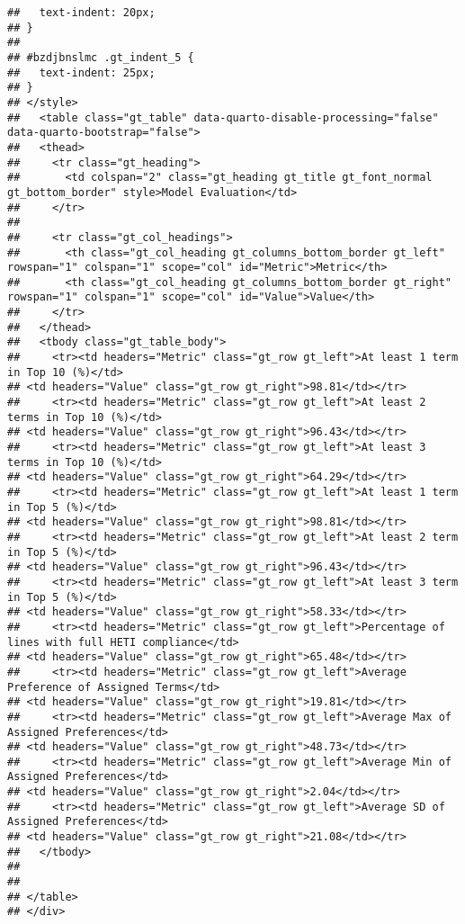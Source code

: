 \documentclass[
]{article}
\begin{document}
\begin{verbatim}
##   text-indent: 20px;
## }
## 
## #bzdjbnslmc .gt_indent_5 {
##   text-indent: 25px;
## }
## </style>
##   <table class="gt_table" data-quarto-disable-processing="false" data-quarto-bootstrap="false">
##   <thead>
##     <tr class="gt_heading">
##       <td colspan="2" class="gt_heading gt_title gt_font_normal gt_bottom_border" style>Model Evaluation</td>
##     </tr>
##     
##     <tr class="gt_col_headings">
##       <th class="gt_col_heading gt_columns_bottom_border gt_left" rowspan="1" colspan="1" scope="col" id="Metric">Metric</th>
##       <th class="gt_col_heading gt_columns_bottom_border gt_right" rowspan="1" colspan="1" scope="col" id="Value">Value</th>
##     </tr>
##   </thead>
##   <tbody class="gt_table_body">
##     <tr><td headers="Metric" class="gt_row gt_left">At least 1 term in Top 10 (%)</td>
## <td headers="Value" class="gt_row gt_right">98.81</td></tr>
##     <tr><td headers="Metric" class="gt_row gt_left">At least 2 terms in Top 10 (%)</td>
## <td headers="Value" class="gt_row gt_right">96.43</td></tr>
##     <tr><td headers="Metric" class="gt_row gt_left">At least 3 terms in Top 10 (%)</td>
## <td headers="Value" class="gt_row gt_right">64.29</td></tr>
##     <tr><td headers="Metric" class="gt_row gt_left">At least 1 term in Top 5 (%)</td>
## <td headers="Value" class="gt_row gt_right">98.81</td></tr>
##     <tr><td headers="Metric" class="gt_row gt_left">At least 2 term in Top 5 (%)</td>
## <td headers="Value" class="gt_row gt_right">96.43</td></tr>
##     <tr><td headers="Metric" class="gt_row gt_left">At least 3 term in Top 5 (%)</td>
## <td headers="Value" class="gt_row gt_right">58.33</td></tr>
##     <tr><td headers="Metric" class="gt_row gt_left">Percentage of lines with full HETI compliance</td>
## <td headers="Value" class="gt_row gt_right">65.48</td></tr>
##     <tr><td headers="Metric" class="gt_row gt_left">Average Preference of Assigned Terms</td>
## <td headers="Value" class="gt_row gt_right">19.81</td></tr>
##     <tr><td headers="Metric" class="gt_row gt_left">Average Max of Assigned Preferences</td>
## <td headers="Value" class="gt_row gt_right">48.73</td></tr>
##     <tr><td headers="Metric" class="gt_row gt_left">Average Min of Assigned Preferences</td>
## <td headers="Value" class="gt_row gt_right">2.04</td></tr>
##     <tr><td headers="Metric" class="gt_row gt_left">Average SD of Assigned Preferences</td>
## <td headers="Value" class="gt_row gt_right">21.08</td></tr>
##   </tbody>
##   
##   
## </table>
## </div>
\end{verbatim}
\end{document}

